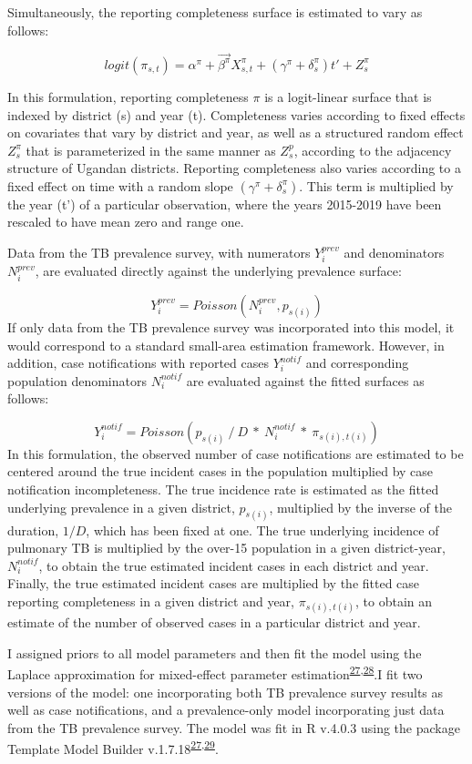 \documentclass[
]{article}
\begin{document}
Simultaneously, the reporting completeness surface is estimated to vary as follows:

\[logit(\pi_{s,t}) = \alpha^\pi + \overrightarrow{\beta^\pi}X^\pi_{s,t} + (\gamma^\pi + \delta^\pi_s)t' + Z^\pi_s\]

In this formulation, reporting completeness \(\pi\) is a logit-linear surface that is indexed by district (s) and year (t). Completeness varies according to fixed effects on covariates that vary by district and year, as well as a structured random effect \(Z^\pi_s\) that is parameterized in the same manner as \(Z^p_s\), according to the adjacency structure of Ugandan districts. Reporting completeness also varies according to a fixed effect on time with a random slope \((\gamma^\pi + \delta^\pi_s)\). This term is multiplied by the year (t') of a particular observation, where the years 2015-2019 have been rescaled to have mean zero and range one.

Data from the TB prevalence survey, with numerators \(Y^{prev}_i\) and denominators \(N^{prev}_i\), are evaluated directly against the underlying prevalence surface:

\[Y^{prev}_i = Poisson(N^{prev}_i, p_{s(i)})\]
If only data from the TB prevalence survey was incorporated into this model, it would correspond to a standard small-area estimation framework. However, in addition, case notifications with reported cases \(Y^{notif}_i\) and corresponding population denominators \(N^{notif}_i\) are evaluated against the fitted surfaces as follows:

\[Y^{notif}_i = Poisson(p_{s(i)} ~/~ D ~*~ N^{notif}_i ~*~ \pi_{s(i),t(i)})\]
In this formulation, the observed number of case notifications are estimated to be centered around the true incident cases in the population multiplied by case notification incompleteness. The true incidence rate is estimated as the fitted underlying prevalence in a given district, \(p_{s(i)}\), multiplied by the inverse of the duration, \(1/D\), which has been fixed at one. The true underlying incidence of pulmonary TB is multiplied by the over-15 population in a given district-year, \(N^{notif}_i\), to obtain the true estimated incident cases in each district and year. Finally, the true estimated incident cases are multiplied by the fitted case reporting completeness in a given district and year, \(\pi_{s(i),t(i)}\), to obtain an estimate of the number of observed cases in a particular district and year.

I assigned priors to all model parameters and then fit the model using the Laplace approximation for mixed-effect parameter estimation\textsuperscript{\protect\hyperlink{ref-Kristensen2016}{27},\protect\hyperlink{ref-Thorson2016}{28}}⁠.I fit two versions of the model: one incorporating both TB prevalence survey results as well as case notifications, and a prevalence-only model incorporating just data from the TB prevalence survey. The model was fit in R v.4.0.3 using the package Template Model Builder v.1.7.18\textsuperscript{\protect\hyperlink{ref-Kristensen2016}{27},\protect\hyperlink{ref-RCoreTeam2018}{29}}.
\end{document}
